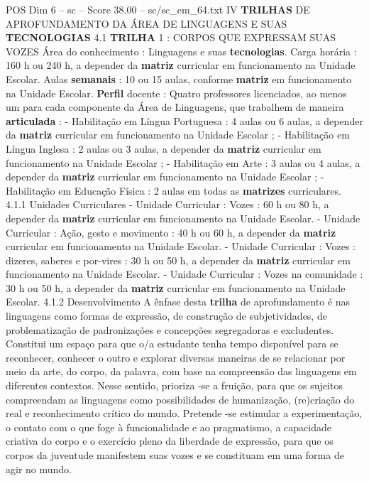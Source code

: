 \begin{textsample}{POS Dim 6 – sc – Score 38.00 – sc/sc\_em\_64.txt}  \label{ex:f6_pos_001}
IV \textbf{TRILHAS} DE APROFUNDAMENTO DA ÁREA DE LINGUAGENS E SUAS \textbf{TECNOLOGIAS} 4.1 \textbf{TRILHA} 1 : CORPOS QUE EXPRESSAM SUAS VOZES Área do conhecimento : Linguagens e suas \textbf{tecnologias}.
Carga horária : 160 h ou 240 h, a depender da \textbf{matriz} curricular em funcionamento na Unidade Escolar.
Aulas \textbf{semanais} : 10 ou 15 aulas, conforme \textbf{matriz} em funcionamento na Unidade Escolar. \textbf{Perfil} docente : Quatro professores licenciados, ao menos um para cada componente da Área de Linguagens, que trabalhem de maneira \textbf{articulada} : - Habilitação em Língua Portuguesa : 4 aulas ou 6 aulas, a depender da \textbf{matriz} curricular em funcionamento na Unidade Escolar ; - Habilitação em Língua Inglesa : 2 aulas ou 3 aulas, a depender da \textbf{matriz} curricular em funcionamento na Unidade Escolar ; - Habilitação em Arte : 3 aulas ou 4 aulas, a depender da \textbf{matriz} curricular em funcionamento na Unidade Escolar ; - Habilitação em Educação Física : 2 aulas em todas as \textbf{matrizes} curriculares. 4.1.1 Unidades Curriculares - Unidade Curricular : Vozes : 60 h ou 80 h, a depender da \textbf{matriz} curricular em funcionamento na Unidade Escolar. - Unidade Curricular : Ação, gesto e movimento : 40 h ou 60 h, a depender da \textbf{matriz} curricular em funcionamento na Unidade Escolar. - Unidade Curricular : Vozes : dizeres, saberes e por-vires : 30 h ou 50 h, a depender da \textbf{matriz} curricular em funcionamento na Unidade Escolar. - Unidade Curricular : Vozes na comunidade : 30 h ou 50 h, a depender da \textbf{matriz} curricular em funcionamento na Unidade Escolar. 4.1.2 Desenvolvimento A ênfase desta \textbf{trilha} de aprofundamento é nas linguagens como formas de expressão, de construção de subjetividades, de problematização de padronizações e concepções segregadoras e excludentes.
Constitui um espaço para que o/a estudante tenha tempo disponível para se reconhecer, conhecer o outro e explorar diversas maneiras de se relacionar por meio da arte, do corpo, da palavra, com base na compreensão das linguagens em diferentes contextos.
Nesse sentido, prioriza -se a fruição, para que os sujeitos compreendam as linguagens como possibilidades de humanização, (re)criação do real e reconhecimento crítico do mundo.
Pretende -se estimular a experimentação, o contato com o que foge à funcionalidade e ao pragmatismo, a capacidade criativa do corpo e o exercício pleno da liberdade de expressão, para que os corpos da juventude manifestem suas vozes e se constituam em uma forma de agir no mundo.

\end{textsample}
